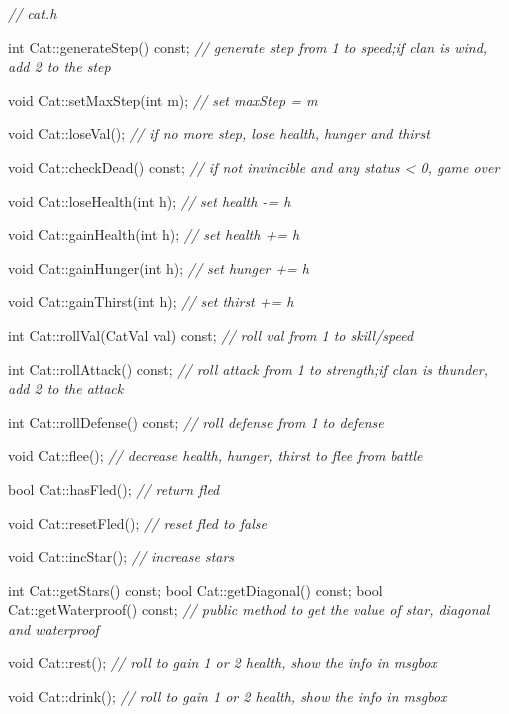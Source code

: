 \documentclass[hyperref,UTF8,a4paper]{ctexart}
\newenvironment{Shaded}{}{}
\newcommand{\AttributeTok}[1]{\textcolor[rgb]{0.49,0.56,0.16}{#1}}
\newcommand{\CommentTok}[1]{\textcolor[rgb]{0.38,0.63,0.69}{\textit{#1}}}
\newcommand{\DataTypeTok}[1]{\textcolor[rgb]{0.56,0.13,0.00}{#1}}
\newcommand{\NormalTok}[1]{#1}
\begin{document}
\begin{Shaded}
\begin{Highlighting}[]
\CommentTok{// cat.h}

\DataTypeTok{int}\NormalTok{ Cat::generateStep() }\AttributeTok{const}\NormalTok{;}
\CommentTok{// generate step from 1 to speed;if clan is wind, add 2 to the step}

\DataTypeTok{void}\NormalTok{ Cat::setMaxStep(}\DataTypeTok{int}\NormalTok{ m);}
\CommentTok{// set maxStep = m}

\DataTypeTok{void}\NormalTok{ Cat::loseVal();}
\CommentTok{// if no more step, lose health, hunger and thirst}

\DataTypeTok{void}\NormalTok{ Cat::checkDead() }\AttributeTok{const}\NormalTok{;}
\CommentTok{// if not invincible and any status < 0, game over}

\DataTypeTok{void}\NormalTok{ Cat::loseHealth(}\DataTypeTok{int}\NormalTok{ h);}
\CommentTok{// set health -= h}

\DataTypeTok{void}\NormalTok{ Cat::gainHealth(}\DataTypeTok{int}\NormalTok{ h);}
\CommentTok{// set health += h}

\DataTypeTok{void}\NormalTok{ Cat::gainHunger(}\DataTypeTok{int}\NormalTok{ h);}
\CommentTok{// set hunger += h}

\DataTypeTok{void}\NormalTok{ Cat::gainThirst(}\DataTypeTok{int}\NormalTok{ h);}
\CommentTok{// set thirst += h}

\DataTypeTok{int}\NormalTok{ Cat::rollVal(CatVal val) }\AttributeTok{const}\NormalTok{;}
\CommentTok{// roll val from 1 to skill/speed}

\DataTypeTok{int}\NormalTok{ Cat::rollAttack() }\AttributeTok{const}\NormalTok{;}
\CommentTok{// roll attack from 1 to strength;if clan is thunder, add 2 to the attack}

\DataTypeTok{int}\NormalTok{ Cat::rollDefense() }\AttributeTok{const}\NormalTok{;}
\CommentTok{// roll defense from 1 to defense}

\DataTypeTok{void}\NormalTok{ Cat::flee();}
\CommentTok{// decrease health, hunger, thirst to flee from battle}

\DataTypeTok{bool}\NormalTok{ Cat::hasFled();}
\CommentTok{// return fled}

\DataTypeTok{void}\NormalTok{ Cat::resetFled();}
\CommentTok{// reset fled to false}

\DataTypeTok{void}\NormalTok{ Cat::incStar();}
\CommentTok{// increase stars}

\DataTypeTok{int}\NormalTok{ Cat::getStars() }\AttributeTok{const}\NormalTok{;}
\DataTypeTok{bool}\NormalTok{ Cat::getDiagonal() }\AttributeTok{const}\NormalTok{;}
\DataTypeTok{bool}\NormalTok{ Cat::getWaterproof() }\AttributeTok{const}\NormalTok{;}
\CommentTok{// public method to get the value of star, diagonal and waterproof}

\DataTypeTok{void}\NormalTok{ Cat::rest();}
\CommentTok{// roll to gain 1 or 2 health, show the info in msgbox}

\DataTypeTok{void}\NormalTok{ Cat::drink();}
\CommentTok{// roll to gain 1 or 2 health, show the info in msgbox}
\end{Highlighting}
\end{Shaded}
\end{document}
